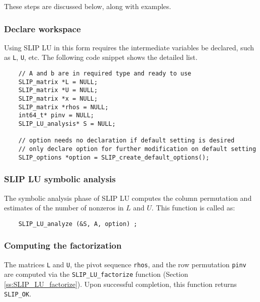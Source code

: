 \documentclass[12pt]{article}
\theoremstyle{definition}
\begin{document}
These steps are discussed below, along with examples.

\subsubsection{Declare workspace}

Using SLIP LU in this form requires the intermediate variables be declared,
such as \verb|L|, \verb|U|, etc. The following code snippet shows the
detailed list.

{\small
\begin{verbatim}
    // A and b are in required type and ready to use
    SLIP_matrix *L = NULL;
    SLIP_matrix *U = NULL;
    SLIP_matrix *x = NULL;
    SLIP_matrix *rhos = NULL;
    int64_t* pinv = NULL;
    SLIP_LU_analysis* S = NULL;

    // option needs no declaration if default setting is desired
    // only declare option for further modification on default setting
    SLIP_options *option = SLIP_create_default_options();
     \end{verbatim} }

\subsubsection{SLIP LU symbolic analysis}

The symbolic analysis phase of SLIP LU computes the column permutation and
estimates of the number of nonzeros in $L$ and $U$. This function is called as:

{\small
    \begin{verbatim}
    SLIP_LU_analyze (&S, A, option) ; \end{verbatim} }


\subsubsection{Computing the factorization}

The matrices \verb|L| and \verb|U|, the pivot sequence \verb|rhos|, and the row
permutation \verb|pinv| are computed via the \verb|SLIP_LU_factorize| function
(Section \ref{ss:SLIP_LU_factorize}).  Upon successful completion, this
function returns \verb|SLIP_OK|.
\end{document}
